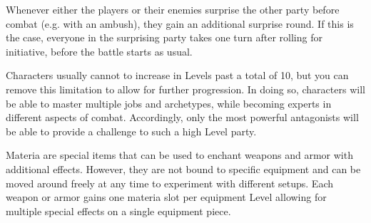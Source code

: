 \begin{description}[leftmargin=*]
\vfill

\item[\color{accent} Back Attack:]
Whenever either the players or their enemies surprise the other party before combat (e.g. with an ambush), they gain an additional surprise round.
If this is the case, everyone in the surprising party takes one turn after rolling for initiative, before the battle starts as usual.

\vfill

\item[\color{accent} Unlimited Progression:]
Characters usually cannot to increase in Levels past a total of 10, but you can remove this limitation to allow for further progression.
In doing so, characters will be able to master multiple jobs and archetypes, while becoming experts in different aspects of combat.	
Accordingly, only the most powerful antagonists will be able to provide a challenge to such a high Level party.

\vfill

\item[\color{accent} Materia:]
Materia are special items that can be used to enchant weapons and armor with additional effects.
However, they are not bound to specific equipment and can be moved around freely at any time to experiment with different setups. 
Each weapon or armor gains one materia slot per equipment Level allowing for multiple special effects on a single equipment piece.

\end{description}

\clearpage

